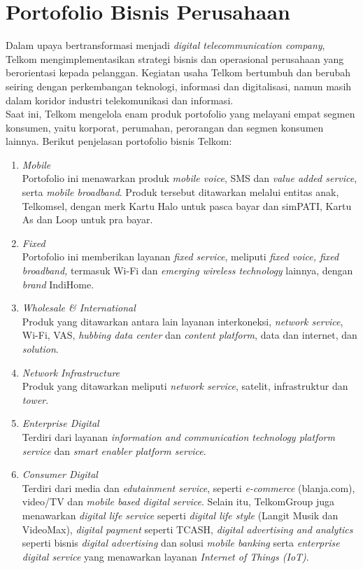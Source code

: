 \section{Portofolio Bisnis Perusahaan}
\tab Dalam upaya bertransformasi menjadi \textit{digital telecommunication company}, Telkom mengimplementasikan strategi bisnis dan operasional perusahaan yang berorientasi kepada pelanggan. Kegiatan usaha Telkom bertumbuh dan berubah seiring dengan perkembangan teknologi, informasi dan digitalisasi, namun masih dalam koridor industri telekomunikasi dan informasi.\\
\tab Saat ini, Telkom mengelola enam produk portofolio yang melayani empat segmen konsumen, yaitu korporat, perumahan, perorangan dan segmen konsumen lainnya. Berikut penjelasan portofolio bisnis Telkom:
\begin{enumerate}
	\item \textit{Mobile}\\
	\tab Portofolio ini menawarkan produk \textit{mobile voice}, SMS dan \textit{value added service}, serta \textit{mobile broadband}. Produk tersebut ditawarkan melalui entitas anak, Telkomsel, dengan merk  Kartu Halo untuk pasca bayar dan simPATI, Kartu As dan Loop untuk pra bayar.\\
	\item \textit{Fixed}\\
	\tab Portofolio ini memberikan layanan \textit{fixed service}, meliputi \textit{fixed voice, fixed broadband, }termasuk Wi-Fi dan \textit{emerging wireless technology} lainnya, dengan \textit{brand} IndiHome.\\
	\item \textit{Wholesale \& International}\\
	\tab Produk yang ditawarkan antara lain layanan interkoneksi, \textit{network service}, Wi-Fi, VAS, \textit{hubbing data center} dan \textit{content platform}, data dan internet, dan \textit{solution}.\\
	\item \textit{Network Infrastructure}\\
	\tab Produk yang ditawarkan meliputi \textit{network service}, satelit, infrastruktur dan \textit{tower}.\\
	\item \textit{Enterprise Digital}\\
	\tab Terdiri dari layanan \textit{information and communication technology platform service} dan \textit{smart enabler platform service}.\\
	\item \textit{Consumer Digital}\\
	\tab Terdiri dari media dan \textit{edutainment service}, seperti \textit{e-commerce} (blanja.com), video/TV dan \textit{mobile based digital service}. Selain itu, TelkomGroup juga menawarkan \textit{digital life service} seperti \textit{digital life style} (Langit Musik dan VideoMax), \textit{digital payment} seperti TCASH, \textit{digital advertising and analytics} seperti bisnis \textit{digital advertising} dan solusi \textit{mobile banking} serta \textit{enterprise digital service} yang menawarkan layanan \textit{Internet of Things (IoT)}.
\end{enumerate}

